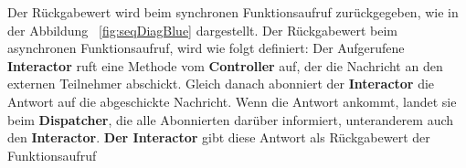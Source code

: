 Der Rückgabewert wird beim synchronen Funktionsaufruf zurückgegeben, wie in der Abbildung ~\ref{fig:seqDiagBlue} dargestellt.
Der Rückgabewert beim asynchronen Funktionsaufruf, wird wie folgt definiert:
Der Aufgerufene \textbf{Interactor} ruft eine Methode vom \textbf{Controller} auf, der die Nachricht an den externen Teilnehmer abschickt. 
Gleich danach abonniert der \textbf{Interactor} die Antwort auf die abgeschickte Nachricht. Wenn die Antwort ankommt, landet sie beim \textbf{Dispatcher},
die alle Abonnierten darüber informiert, unteranderem auch den \textbf{Interactor}. 
\textbf{Der Interactor} gibt diese Antwort als Rückgabewert der Funktionsaufruf